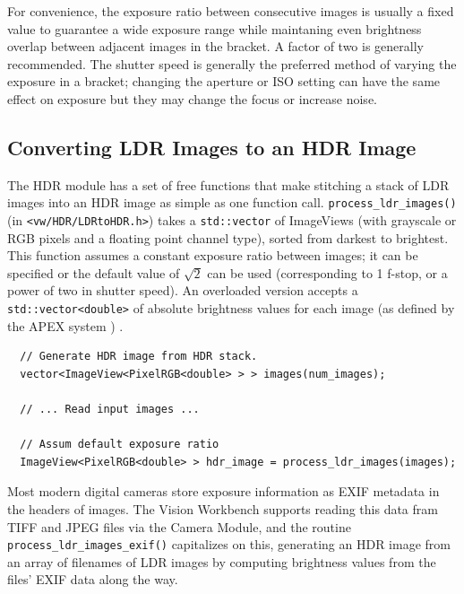For convenience, the exposure ratio between consecutive images is
usually a fixed value to guarantee a wide exposure range while
maintaning even brightness overlap between adjacent images in the
bracket. A factor of two is generally recommended.  The shutter speed
is generally the preferred method of varying the exposure in a
bracket; changing the aperture or ISO setting can have the same effect
on exposure but they may change the focus or increase noise.

\subsection{Converting LDR Images to an HDR Image}
The HDR module has a set of free functions that make stitching a stack
of LDR images into an HDR image as simple as one function
call. \verb#process_ldr_images()# (in \verb#<vw/HDR/LDRtoHDR.h>#)
takes a \verb#std::vector# of ImageViews (with grayscale or RGB pixels
and a floating point channel type), sorted from darkest to
brightest. This function assumes a constant exposure ratio between
images; it can be specified or the default value of $\sqrt{2}$ can be
used (corresponding to 1 f-stop, or a power of two in shutter
speed). An overloaded version accepts a \verb#std::vector<double># of
absolute brightness values for each image (as defined by the APEX
system \cite{apex}) .

\begin{verbatim}
  // Generate HDR image from HDR stack. 
  vector<ImageView<PixelRGB<double> > > images(num_images);
  
  // ... Read input images ...

  // Assum default exposure ratio
  ImageView<PixelRGB<double> > hdr_image = process_ldr_images(images);
\end{verbatim}

Most modern digital cameras store exposure information as EXIF
metadata in the headers of images.  The Vision Workbench supports
reading this data fram TIFF and JPEG files via the Camera Module, and
the routine \verb#process_ldr_images_exif()# capitalizes on this,
generating an HDR image from an array of filenames of LDR images by
computing brightness values from the files' EXIF data along the
way. 


